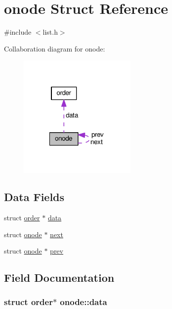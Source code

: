 \hypertarget{structonode}{\section{onode Struct Reference}
\label{structonode}
}


{\ttfamily \#include $<$list.\-h$>$}



Collaboration diagram for onode\-:\nopagebreak
\begin{figure}[H]
\begin{center}
\leavevmode
\includegraphics[width=162pt]{structonode__coll__graph}
\end{center}
\end{figure}
\subsection*{Data Fields}
\begin{DoxyCompactItemize}
\item 
struct \hyperlink{structorder}{order} $\ast$ \hyperlink{structonode_ab7312b747804b1474c83bd2bb7df8d3c}{data}
\item 
struct \hyperlink{structonode}{onode} $\ast$ \hyperlink{structonode_ac9704e6f9b12c04f52e61c856f8c1e29}{next}
\item 
struct \hyperlink{structonode}{onode} $\ast$ \hyperlink{structonode_a597f99367f877e2e4a9cafe4be30e837}{prev}
\end{DoxyCompactItemize}


\subsection{Field Documentation}
\hypertarget{structonode_ab7312b747804b1474c83bd2bb7df8d3c}{
\subsubsection[{data}]{\setlength{\rightskip}{0pt plus 5cm}struct {\bf order}$\ast$ onode\-::data}}\label{structonode_ab7312b747804b1474c83bd2bb7df8d3c}


